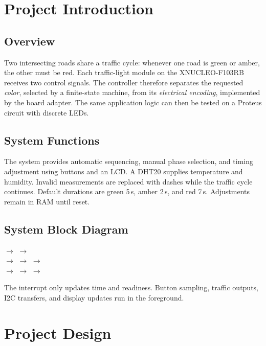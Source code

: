 \section{Project Introduction}
\subsection{Overview}
Two intersecting roads share a traffic cycle: whenever one road is green or amber, the other must be red. Each traffic-light module on the XNUCLEO-F103RB receives two control signals. The controller therefore separates the requested \emph{color}, selected by a finite-state machine, from its \emph{electrical encoding}, implemented by the board adapter. The same application logic can then be tested on a Proteus circuit with discrete LEDs.

\subsection{System Functions}
The system provides automatic sequencing, manual phase selection, and timing adjustment using buttons and an LCD. A DHT20 supplies temperature and humidity. Invalid measurements are replaced with dashes while the traffic cycle continues. Default durations are green 5\,s, amber 2\,s, and red 7\,s. Adjustments remain in RAM until reset.

\subsection{System Block Diagram}
\begin{center}
 $\longrightarrow$ 
$\longrightarrow$ \\[4pt]
 $\longrightarrow$ 
$\longrightarrow$  $\longrightarrow$ \\[4pt]
 $\longrightarrow$ 
$\longrightarrow$  $\longrightarrow$ 
\end{center}
The interrupt only updates time and readiness. Button sampling, traffic outputs, I2C transfers, and display updates run in the foreground.

\section{Project Design}
